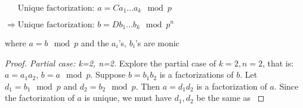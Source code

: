 \begin{frame}
	\begin{theorem}

$\phantom{\Rightarrow}\text{Unique factorization: }
a=C a_1\dots a_k  \mod p$

$\Rightarrow\text{Unique factorization: }
b =D b_1\dots b_k \mod p^{n}
$ 

where $a=b \mod p$ and the $a_i$'s, $b_i$'s are monic 

	\end{theorem}
\begin{proof}[Proof. Partial case: k=2, n=2]
	Explore the partial case of $k=2, n=2 $, that is: $a=a_1a_2$, $b= a \mod p$.
	Suppose $b=b_1b_2$ is a factorizations of $b$. Let  $d_1= b_1 \mod p$ and $d_2 = b_2 \mod p$. Then $a=d_1 d_2$ is a factorization of $a$. Since the factorization of $a$ is unique, we must have $d_1, d_2$ be the same as $ $
\end{proof}
\end{frame}